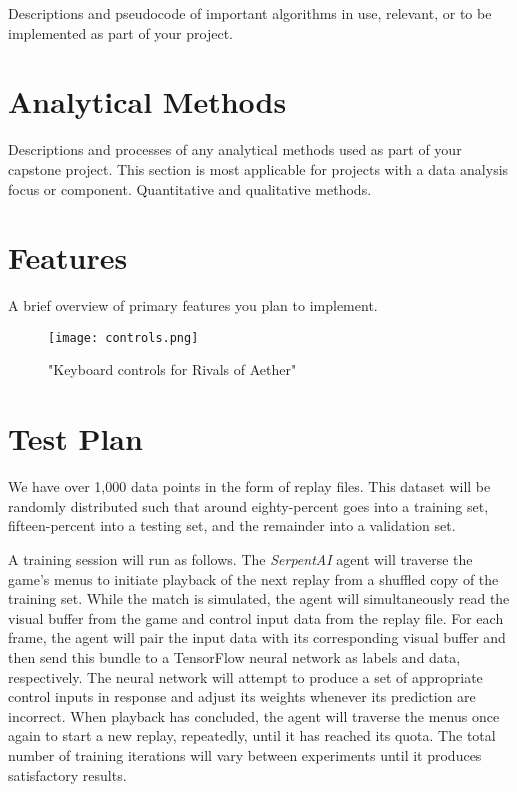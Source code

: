 Descriptions and pseudocode of important algorithms in use, relevant, or to be implemented as part of your project.




\section{Analytical Methods}

Descriptions and processes of any analytical methods used as part of your capstone project. This section is most applicable for projects with a data analysis focus or component. Quantitative and qualitative methods.




\section{Features}

A brief overview of primary features you plan to implement.

\begin{figure}
	\caption{"Keyboard controls for Rivals of Aether"}
	\centering
	\texttt{[image: controls.png]} \\
\end{figure}




\section{Test Plan}

We have over 1,000 data points in the form of replay files. This dataset will be randomly distributed such that around eighty-percent goes into a training set, fifteen-percent into a testing set, and the remainder into a validation set.

A training session will run as follows. The {\it SerpentAI} agent will traverse the game's menus to initiate playback of the next replay from a shuffled copy of the training set. While the match is simulated, the agent will simultaneously read the visual buffer from the game and control input data from the replay file. For each frame, the agent will pair the input data with its corresponding visual buffer and then send this bundle to a TensorFlow neural network as labels and data, respectively. The neural network will attempt to produce a set of appropriate control inputs in response and adjust its weights  whenever its prediction are incorrect. When playback has concluded, the agent will traverse the menus once again to start a new replay, repeatedly, until it has reached its quota. The total number of training iterations will vary between experiments until it produces satisfactory results.

